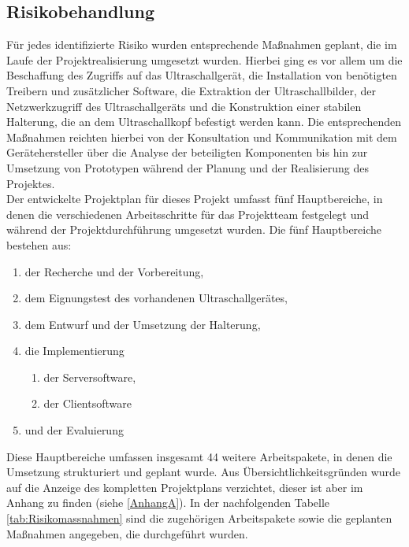 \subsection{Risikobehandlung}
Für jedes identifizierte Risiko wurden entsprechende Maßnahmen geplant, die im Laufe der Projektrealisierung umgesetzt wurden. Hierbei ging es vor allem um die Beschaffung des Zugriffs auf das Ultraschallgerät, die Installation von benötigten Treibern und zusätzlicher Software, die Extraktion der Ultraschallbilder, der Netzwerkzugriff des Ultraschallgeräts und die Konstruktion einer stabilen Halterung, die an dem Ultraschallkopf befestigt werden kann. Die entsprechenden Maßnahmen reichten hierbei von der Konsultation und Kommunikation mit dem Gerätehersteller über die Analyse der beteiligten Komponenten bis hin zur Umsetzung von Prototypen während der Planung und der Realisierung des Projektes. \\ 
Der entwickelte Projektplan für dieses Projekt umfasst fünf Hauptbereiche, in denen die verschiedenen Arbeitsschritte für das Projektteam festgelegt  und während der Projektdurchführung umgesetzt wurden. Die fünf Hauptbereiche bestehen aus: 
\begin{enumerate}
\item der Recherche und der Vorbereitung,
\item dem Eignungstest des vorhandenen Ultraschallgerätes,
\item dem Entwurf und der Umsetzung der Halterung,
\item die Implementierung 
	\begin{enumerate}
         \item der Serversoftware,
         \item der Clientsoftware
	\end{enumerate}
\item und der Evaluierung
\end{enumerate}

Diese Hauptbereiche umfassen insgesamt 44 weitere Arbeitspakete, in denen die Umsetzung strukturiert und geplant wurde. Aus Übersichtlichkeitsgründen wurde auf die Anzeige des kompletten Projektplans verzichtet, dieser ist aber im Anhang zu finden (siehe \ref{AnhangA}). In der nachfolgenden Tabelle \ref{tab:Risikomassnahmen} sind die zugehörigen Arbeitspakete sowie die geplanten Maßnahmen angegeben, die durchgeführt wurden.

